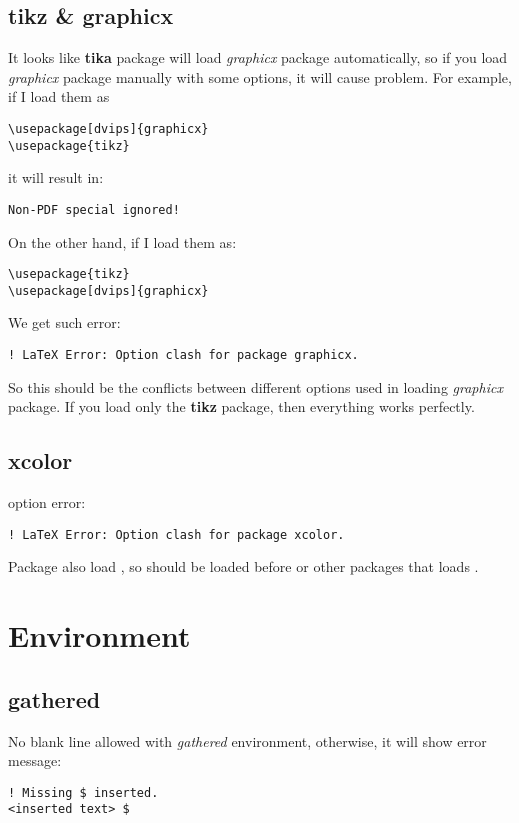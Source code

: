 \subsection{tikz \& graphicx}
It looks like \textbf{tika} package will load \emph{graphicx} package
automatically, so if you load \emph{graphicx} package manually with some
options, it will cause problem. For example, if I load them as
\begin{verbatim}
\usepackage[dvips]{graphicx}
\usepackage{tikz}
\end{verbatim}
it will result in:
\begin{verbatim}
Non-PDF special ignored!
\end{verbatim}
On the other hand, if I load them as:
\begin{verbatim}
\usepackage{tikz}
\usepackage[dvips]{graphicx}
\end{verbatim}
We get such error:
\begin{verbatim}
! LaTeX Error: Option clash for package graphicx.
\end{verbatim}

So this should be the conflicts between different options used in loading
\emph{graphicx} package. If you load only the \textbf{tikz} package, 
then everything works perfectly.

\subsection{xcolor}
 option error:
\begin{verbatim}
! LaTeX Error: Option clash for package xcolor.
\end{verbatim}
Package  also load , so
 should be loaded before  or 
other packages that loads .

\section{Environment}

\subsection{gathered}
No blank line allowed with \emph{gathered} environment, otherwise, it will show
error message:
\begin{verbatim}
! Missing $ inserted.
<inserted text> $
\end{verbatim}

